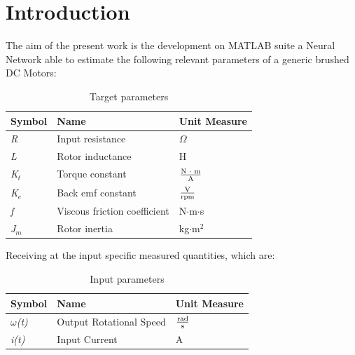 


\newpage

\section{\textbf{Introduction}}

The aim of the present work is the development on MATLAB suite a Neural Network able to estimate the following relevant parameters of a generic brushed DC Motors:

\begin{table}[h!] %
\centering	
\renewcommand{\arraystretch}{1.5} 
\begin{tabular}{| l l l |} 
 \hline
 Symbol & Name & Unit Measure \\ [0.5ex]  
 \hline\hline
	\textit{R} & Input resistance & $\Omega$\\ 
	\textit{L} & Rotor inductance & H\\
	\textit{K$_{t}$} & Torque constant & $\frac{\text{N $\cdot$ m}}{\text{A}}$\\
	\textit{K$_{e}$} & Back emf constant & $\frac{\text{V}}{\text{rpm}} $\\
	\textit{f} & Viscous friction coefficient & N$\cdot$m$\cdot$s\\
	\textit{J$_{m}$} & Rotor inertia & kg$\cdot$m$^2$\\
 \hline
\end{tabular}
\caption{Target parameters}
\label{table:targetprm}
\end{table}

Receiving at the input specific measured quantities, which are:

\begin{table}[h!] %
\centering	
\renewcommand{\arraystretch}{1.5} 
\begin{tabular}{| l l l |} 
 \hline
 Symbol & Name & Unit Measure \\ [0.5ex]  
 \hline\hline
	\textit{$\omega$(t)} & Output Rotational Speed & $\frac{\text{rad}}{\text{s}}$\\ 
	\textit{i(t)} & Input Current & A\\
 \hline
\end{tabular}
\caption{Input parameters}
\label{table:inputprm}
\end{table}


